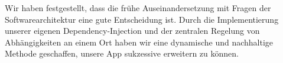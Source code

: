 	Wir haben festgestellt, dass die frühe Auseinandersetzung mit Fragen der Softwarearchitektur eine gute Entscheidung ist. Durch die Implementierung unserer eigenen Dependency-Injection und der zentralen Regelung von Abhängigkeiten an einem Ort haben wir eine dynamische und nachhaltige Methode geschaffen, unsere App sukzessive erweitern zu können.